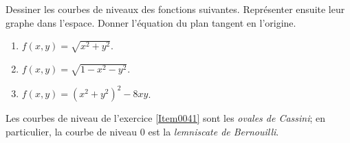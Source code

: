 
\begin{exercice}\label{exo0041}

Dessiner les courbes de niveaux des fonctions suivantes. Représenter ensuite leur graphe dans l'espace. Donner l'équation du plan tangent en l'origine.
\begin{enumerate}
\item 			$f(x,y) = \sqrt{x^2+y^2}$.
\item 			$f(x,y) = \sqrt{1-x^2-y^2}$.
\item\label{Item0041}	$f(x,y) = (x^2+y^2)^2-8xy$. 
\end{enumerate}
 Les courbes de niveau de l'exercice \ref{Item0041} sont  les \emph{ovales de Cassini}; en particulier, la courbe de niveau 0 est la \emph{lemniscate de Bernouilli}.
\end{exercice}
